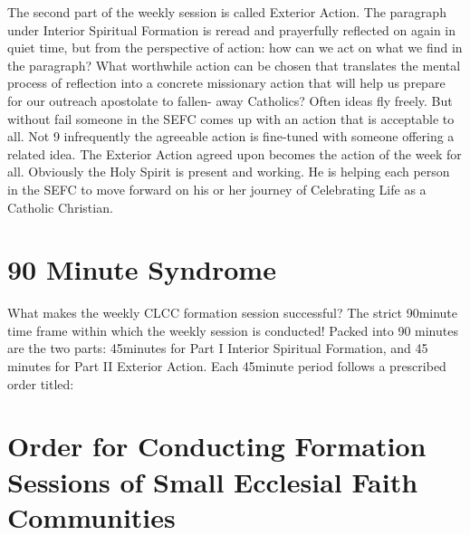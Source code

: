 \documentclass{article}        %
\begin{document}
The second part of the weekly session is called Exterior Action. The paragraph
under Interior Spiritual Formation is reread and prayerfully reflected on again
in quiet time, but from the perspective of action: how can we act on what we
find in the paragraph? What worthwhile action can be chosen that translates the
mental process of reflection into a concrete missionary action that will help us
prepare for our outreach apostolate to fallen- away Catholics? Often ideas fly
freely. But without fail someone in the SEFC comes up with an action that is
acceptable to all. Not
9
infrequently the agreeable action is fine-tuned with someone offering a related
idea. The Exterior Action agreed upon becomes the action of the week for
all. Obviously the Holy Spirit is present and working. He is helping each person
in the SEFC to move forward on his or her journey of Celebrating Life as a
Catholic Christian.

\section{90 Minute Syndrome}

What makes the weekly CLCC formation session successful? The strict 90minute
time frame within which the weekly session is conducted! Packed into 90 minutes
are the two parts: 45minutes for Part I Interior Spiritual Formation, and 45
minutes for Part II Exterior Action. Each 45minute period follows a prescribed
order titled:

\section{Order for Conducting Formation Sessions of Small Ecclesial Faith Communities}
\end{document}
